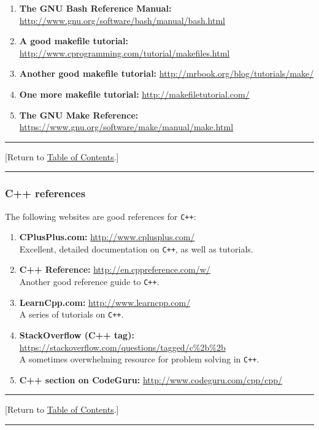 \documentclass[12pt]{article}
\renewcommand{\v}{\verb}
\newcommand{\TOClink}{\begin{center}\hrule\vskip-5pt\phantom{.}\hfill[Return to \hyperlink{TOC}{Table of Contents}.]\hfill\phantom{.}\vskip3pt\hrule\end{center}}
\begin{document}
\begin{enumerate}
\item \textbf{The GNU Bash Reference Manual:} \href{http://www.gnu.org/software/bash/manual/bash.html}{http://www.gnu.org/software/bash/manual/bash.html}

\item 
\textbf{A good makefile tutorial:} \href{http://www.cprogramming.com/tutorial/makefiles.html}{http://www.cprogramming.com/tutorial/makefiles.html} 

\item 
\textbf{Another good makefile tutorial:} \href{http://mrbook.org/blog/tutorials/make/}{http://mrbook.org/blog/tutorials/make/}

\item 
\textbf{One more makefile tutorial:} \href{http://makefiletutorial.com/}{http://makefiletutorial.com/}

\item
\textbf{The GNU Make Reference:} \href{https://www.gnu.org/software/make/manual/make.html}{https://www.gnu.org/software/make/manual/make.html}

\end{enumerate}
\TOClink 

\subsubsection{C++ references}
The following websites are good references for \v|C++|: 
\begin{enumerate}
\item 
\textbf{CPlusPlus.com:} 
\href{http://www.cplusplus.com/}{http://www.cplusplus.com/}\\
Excellent, detailed documentation on \v|C++|, as well as tutorials. 

\item 
\textbf{C++ Reference:}
\href{http://en.cppreference.com/w/}{http://en.cppreference.com/w/}\\
Another good reference guide to \v|C++|. 

\item 
\textbf{LearnCpp.com:} 
\href{http://www.learncpp.com/}{http://www.learncpp.com/} \\
A series of tutorials on \v|C++|. 

\item 
\textbf{StackOverflow (C++ tag):} 
\href{https://stackoverflow.com/questions/tagged/c%2b%2b}{https://stackoverflow.com/questions/tagged/c\%2b\%2b}\\
A sometimes overwhelming resource for problem solving in \v|C++|. 

\item 
\textbf{C++ section on CodeGuru:} 
\href{http://www.codeguru.com/cpp/cpp/}{http://www.codeguru.com/cpp/cpp/}

\end{enumerate}
\TOClink 
\end{document}

